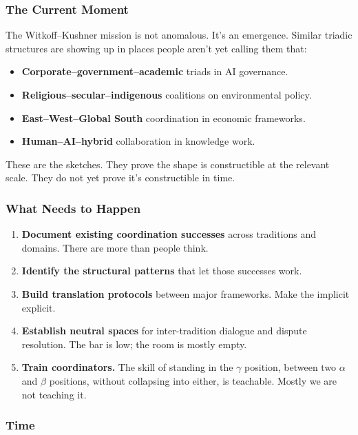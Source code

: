\documentclass[
]{article}
\providecommand{\tightlist}{%
  \setlength{\itemsep}{0pt}\setlength{\parskip}{0pt}}
\begin{document}
\subsubsection{The Current Moment}\label{the-current-moment}

The Witkoff--Kushner mission is not anomalous. It's an emergence.
Similar triadic structures are showing up in places people aren't yet
calling them that:

\begin{itemize}
\tightlist
\item
  \textbf{Corporate--government--academic} triads in AI governance.
\item
  \textbf{Religious--secular--indigenous} coalitions on environmental
  policy.
\item
  \textbf{East--West--Global South} coordination in economic frameworks.
\item
  \textbf{Human--AI--hybrid} collaboration in knowledge work.
\end{itemize}

These are the sketches. They prove the shape is constructible at the
relevant scale. They do not yet prove it's constructible in time.

\subsubsection{What Needs to Happen}\label{what-needs-to-happen}

\begin{enumerate}
\def\labelenumi{\arabic{enumi}.}
\tightlist
\item
  \textbf{Document existing coordination successes} across traditions
  and domains. There are more than people think.
\item
  \textbf{Identify the structural patterns} that let those successes
  work.
\item
  \textbf{Build translation protocols} between major frameworks. Make
  the implicit explicit.
\item
  \textbf{Establish neutral spaces} for inter-tradition dialogue and
  dispute resolution. The bar is low; the room is mostly empty.
\item
  \textbf{Train coordinators.} The skill of standing in the \(\gamma\) position,
  between two \(\alpha\) and \(\beta\) positions, without collapsing into either, is
  teachable. Mostly we are not teaching it.
\end{enumerate}

\subsubsection{Time}\label{time}
\end{document}
